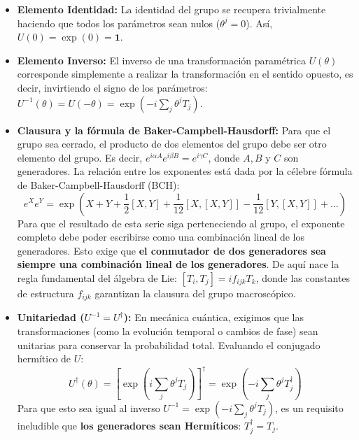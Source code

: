 \begin{itemize}
    \item \textbf{Elemento Identidad:} La identidad del grupo se recupera trivialmente haciendo que todos los parámetros sean nulos ($\theta^j = 0$). Así, $U(0) = \exp(0) = \mathbf{1}$.
    
    \item \textbf{Elemento Inverso:} El inverso de una transformación paramétrica $U(\theta)$ corresponde simplemente a realizar la transformación en el sentido opuesto, es decir, invirtiendo el signo de los parámetros: $U^{-1}(\theta) = U(-\theta) = \exp\left(-i \sum_j \theta^j T_j\right)$.

    \item \textbf{Clausura y la fórmula de Baker-Campbell-Hausdorff:} Para que el grupo sea cerrado, el producto de dos elementos del grupo debe ser otro elemento del grupo. Es decir, $e^{i\alpha A} e^{i\beta B} = e^{i \gamma C}$, donde $A, B$ y $C$ son generadores. La relación entre los exponentes está dada por la célebre fórmula de Baker-Campbell-Hausdorff (BCH):
    \begin{equation}
        e^{X} e^{Y} = \exp\left(X + Y + \frac{1}{2}[X,Y] + \frac{1}{12}[X,[X,Y]] - \frac{1}{12}[Y,[X,Y]] + \dots \right)
    \end{equation}
    Para que el resultado de esta serie siga perteneciendo al grupo, el exponente completo debe poder escribirse como una combinación lineal de los generadores. Esto exige que \textbf{el conmutador de dos generadores sea siempre una combinación lineal de los generadores}. De aquí nace la regla fundamental del álgebra de Lie: $[T_i, T_j] = i f_{ijk} T_k$, donde las constantes de estructura $f_{ijk}$ garantizan la clausura del grupo macroscópico.

    \item \textbf{Unitariedad ($U^{-1} = U^\dagger$):} En mecánica cuántica, exigimos que las transformaciones (como la evolución temporal o cambios de fase) sean unitarias para conservar la probabilidad total. Evaluando el conjugado hermítico de $U$:
    \begin{equation}
        U^\dagger(\theta) = \left[ \exp\left(i \sum_j \theta^j T_j\right) \right]^\dagger = \exp\left(-i \sum_j \theta^j T_j^\dagger\right)
    \end{equation}
    Para que esto sea igual al inverso $U^{-1} = \exp(-i \sum_j \theta^j T_j)$, es un requisito ineludible que \textbf{los generadores sean Hermíticos}: $T_j^\dagger = T_j$.
    

\end{itemize}
